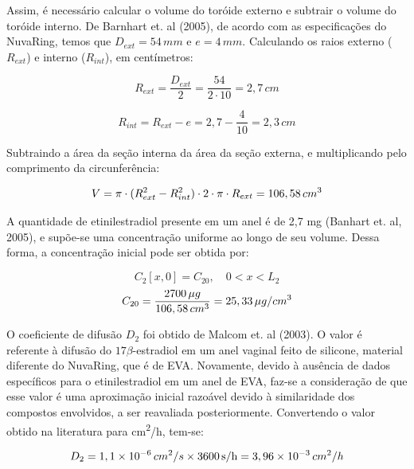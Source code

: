Assim, é necessário calcular o volume do toróide externo e subtrair o volume do toróide interno. De Barnhart et. al (2005), de acordo com as especificações do NuvaRing{\textregistered}, temos que $D_{ext} = 54 \, mm$ e $e = 4 \, mm$. Calculando os raios externo ($R_{ext}$) e interno ($R_{int}$), em centímetros:

\begin{equation}
R_{ext} = \frac{D_{ext}}{2} = \frac{54}{2 \cdot 10} = 2,7 \, cm
\end{equation}

\begin{equation}
R_{int} = R_{ext} - e = 2,7 - \frac{4}{10} = 2,3 \, cm
\end{equation}

Subtraindo a área da seção interna da área da seção externa, e multiplicando pelo comprimento da circunferência:

\begin{equation}
V = \pi \cdot (R_{ext}^2 - R_{int}^2) \cdot 2 \cdot \pi \cdot R_{ext} = 106,58 \, cm\textsuperscript{3}
\end{equation}

A quantidade de etinilestradiol presente em um anel é de 2,7 mg (Banhart et. al, 2005), e supõe-se uma concentração uniforme ao longo de seu volume. Dessa forma, a concentração inicial pode ser obtida por: 

\begin{equation}
C_2[x,0] = C_{20}, \quad 0 < x < L_2
\end{equation}
\begin{equation}
    C_{20} = \frac{2700 \, \mu g}{106,58 \, cm\textsuperscript{3}} =  25,33 \, \mu g/cm\textsuperscript{3}
\end{equation}

O coeficiente de difusão $D_2$ foi obtido de Malcom et. al (2003). O valor é referente à difusão do $17\beta$-estradiol em um anel vaginal feito de silicone, material diferente do NuvaRing, que é de EVA. Novamente, devido à ausência de dados específicos para o etinilestradiol em um anel de EVA, faz-se a consideração de que esse valor é uma aproximação inicial razoável devido à similaridade dos compostos envolvidos, a ser reavaliada posteriormente. Convertendo o valor obtido na literatura para cm\textsuperscript{2}/h, tem-se:

\begin{equation}
D_2 = 1,1 \times 10^{-6} \, cm\textsuperscript{2}/s \times 3600 \, \text{s/h} = 3,96 \times 10^{-3} \, cm\textsuperscript{2}/h
\end{equation}

